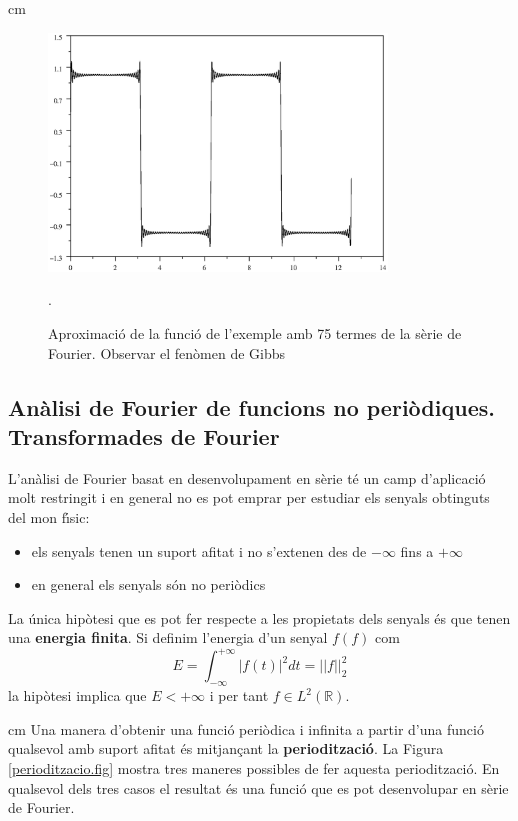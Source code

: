\documentclass{article}
\def\R{\mathbb R}
\begin{document}
 cm

\begin{figure}[htbp]
\begin{center}
\includegraphics[width=9cm]{imatges/pulse75.eps}
\caption{Aproximaci\'o de la funci\'o de l'exemple amb 75 termes de la
s\`erie de Fourier. Observar el fen\`omen de Gibbs}.
\end{center}
\end{figure}

\subsection{An\`alisi de Fourier de funcions no peri\`odiques.
Transformades de Fourier}
L'an\`alisi de Fourier basat en desenvolupament en s\`erie t\'e un 
camp d'aplicaci\'o molt restringit i en general no es pot emprar per
estudiar els senyals obtinguts del mon f\'\i sic:
\begin{itemize}
\item els senyals tenen un suport afitat i no s'extenen des de $-\infty$ 
fins a $+\infty$
\item en general els senyals s\'on no peri\`odics
\end{itemize}
La \'unica hip\`otesi que es pot fer respecte a les propietats dels senyals
\'es que tenen una {\bf energia finita}. Si definim l'energia d'un senyal
$f(f)$ com 
\begin{equation}
\label{eqenergia}
E=\int_{-\infty}^{+\infty} |f(t)|^2 dt=||f||^2_2
\end{equation}
\noindent
la hip\`otesi implica que $E < +\infty$ i per tant $f \in L^2(\R)$.

 cm
Una manera d'obtenir una funci\'o peri\`odica i infinita a partir d'una 
funci\'o qualsevol amb suport afitat \'es mitjan\c{c}ant la 
{\bf perioditzaci\'o}.
La Figura \ref{perioditzacio.fig} mostra tres maneres possibles de fer 
aquesta perioditzaci\'o. En qualsevol dels tres casos el resultat \'es una
funci\'o que es pot desenvolupar en s\`erie de Fourier. 
\end{document}
